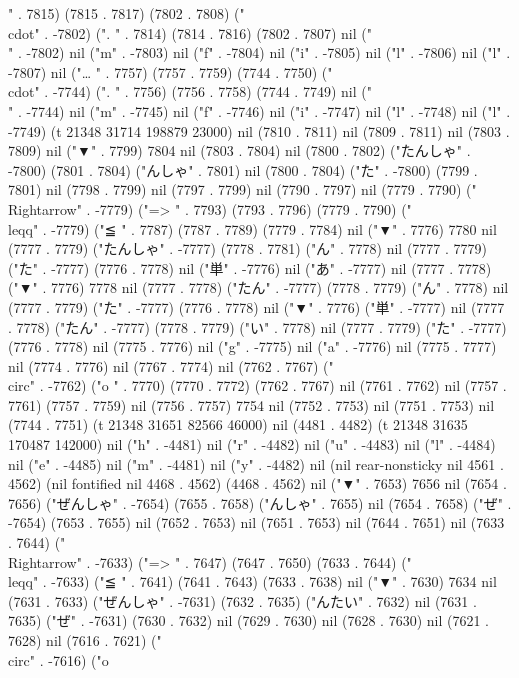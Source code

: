 {" . 7815) (7815 . 7817) (7802 . 7808) ("\\cdot" . -7802) (".
" . 7814) (7814 . 7816) (7802 . 7807) nil ("\\" . -7802) nil ("m" . -7803) nil ("f" . -7804) nil ("i" . -7805) nil ("l" . -7806) nil ("l" . -7807) nil ("…
" . 7757) (7757 . 7759) (7744 . 7750) ("\\cdot" . -7744) (".
" . 7756) (7756 . 7758) (7744 . 7749) nil ("\\" . -7744) nil ("m" . -7745) nil ("f" . -7746) nil ("i" . -7747) nil ("l" . -7748) nil ("l" . -7749) (t 21348 31714 198879 23000) nil (7810 . 7811) nil (7809 . 7811) nil (7803 . 7809) nil ("▼" . 7799) 7804 nil (7803 . 7804) nil (7800 . 7802) ("たんしゃ" . -7800) (7801 . 7804) ("んしゃ" . 7801) nil (7800 . 7804) ("た" . -7800) (7799 . 7801) nil (7798 . 7799) nil (7797 . 7799) nil (7790 . 7797) nil (7779 . 7790) ("\\Rightarrow" . -7779) ("=>
" . 7793) (7793 . 7796) (7779 . 7790) ("\\leqq" . -7779) ("≦
" . 7787) (7787 . 7789) (7779 . 7784) nil ("▼" . 7776) 7780 nil (7777 . 7779) ("たんしゃ" . -7777) (7778 . 7781) ("ん" . 7778) nil (7777 . 7779) ("た" . -7777) (7776 . 7778) nil ("単" . -7776) nil ("あ" . -7777) nil (7777 . 7778) ("▼" . 7776) 7778 nil (7777 . 7778) ("たん" . -7777) (7778 . 7779) ("ん" . 7778) nil (7777 . 7779) ("た" . -7777) (7776 . 7778) nil ("▼" . 7776) ("単" . -7777) nil (7777 . 7778) ("たん" . -7777) (7778 . 7779) ("い" . 7778) nil (7777 . 7779) ("た" . -7777) (7776 . 7778) nil (7775 . 7776) nil ("g" . -7775) nil ("a" . -7776) nil (7775 . 7777) nil (7774 . 7776) nil (7767 . 7774) nil (7762 . 7767) ("\\circ" . -7762) ("o
" . 7770) (7770 . 7772) (7762 . 7767) nil (7761 . 7762) nil (7757 . 7761) (7757 . 7759) nil (7756 . 7757) 7754 nil (7752 . 7753) nil (7751 . 7753) nil (7744 . 7751) (t 21348 31651 82566 46000) nil (4481 . 4482) (t 21348 31635 170487 142000) nil ("h" . -4481) nil ("r" . -4482) nil ("u" . -4483) nil ("l" . -4484) nil ("e" . -4485) nil ("m" . -4481) nil ("y" . -4482) nil (nil rear-nonsticky nil 4561 . 4562) (nil fontified nil 4468 . 4562) (4468 . 4562) nil ("▼" . 7653) 7656 nil (7654 . 7656) ("ぜんしゃ" . -7654) (7655 . 7658) ("んしゃ" . 7655) nil (7654 . 7658) ("ぜ" . -7654) (7653 . 7655) nil (7652 . 7653) nil (7651 . 7653) nil (7644 . 7651) nil (7633 . 7644) ("\\Rightarrow" . -7633) ("=>
" . 7647) (7647 . 7650) (7633 . 7644) ("\\leqq" . -7633) ("≦
" . 7641) (7641 . 7643) (7633 . 7638) nil ("▼" . 7630) 7634 nil (7631 . 7633) ("ぜんしゃ" . -7631) (7632 . 7635) ("んたい" . 7632) nil (7631 . 7635) ("ぜ" . -7631) (7630 . 7632) nil (7629 . 7630) nil (7628 . 7630) nil (7621 . 7628) nil (7616 . 7621) ("\\circ" . -7616) ("o
}
